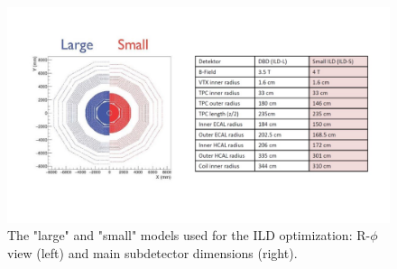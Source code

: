 \begin{figure}[t!]
\centering
\includegraphics[width=1.0\hsize]{ILD/fig/ILD_small-large.jpg}
\caption{The "large" and "small" models used for the ILD optimization: R-$\phi$ view (left) and main subdetector dimensions (right).}
\label{fig:ILD:sizes}
\end{figure}
	
